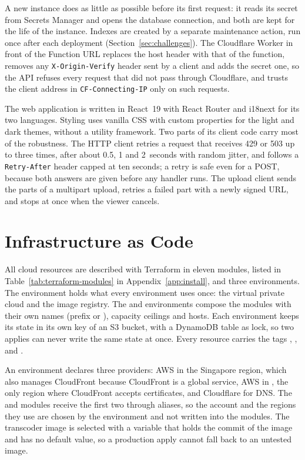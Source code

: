 A new instance does as little as possible before its first request: it reads its secret from Secrets
Manager and opens the database connection, and both are kept for the life of the instance. Indexes
are created by a separate maintenance action, run once after each deployment
(Section~\ref{sec:challenges}). The Cloudflare Worker in front of the Function URL replaces the host
header with that of the function, removes any \texttt{X-Origin-Verify} header sent by a client and
adds the secret one, so the API refuses every request that did not pass through Cloudflare, and
trusts the client address in \texttt{CF-Connecting-IP} only on such requests.

The web application is written in React~19 with React Router and i18next for its two languages.
Styling uses vanilla CSS with custom properties for the light and dark themes, without a utility
framework. Two parts of its client code carry most of the robustness. The HTTP client retries a
request that receives 429 or 503 up to three times, after about 0.5, 1 and 2~seconds
with random jitter, and follows a \texttt{Retry-After} header capped at ten seconds; a retry is safe
even for a POST, because both answers are given before any handler runs. The upload client
sends the parts of a multipart upload, retries a failed part with a newly signed URL, and stops at once
when the viewer cancels.

\section{Infrastructure as Code}
\label{sec:iac}

All cloud resources are described with Terraform in eleven modules, listed in
Table~\ref{tab:terraform-modules} in Appendix~\ref{app:install}, and three environments. The  environment holds what
every environment uses once: the virtual private cloud and the image registry. The  and 
environments compose the modules with their own names (prefix  or
), capacity ceilings and hosts. Each environment keeps its state in its own key of
an S3 bucket, with a DynamoDB table as lock, so two applies can never write the same state at once.
Every resource carries the tags , ,  and
.

An environment declares three providers: AWS in the Singapore region, which also manages
CloudFront because CloudFront is a global service, AWS in , the only region where
CloudFront accepts certificates, and Cloudflare for DNS. The  and  modules
receive the first two through aliases, so the account and the regions they use are chosen by the
environment and not written into the modules. The transcoder image is selected with a variable that holds the commit of the image
and has no default value, so a production apply cannot fall back to an untested image.

